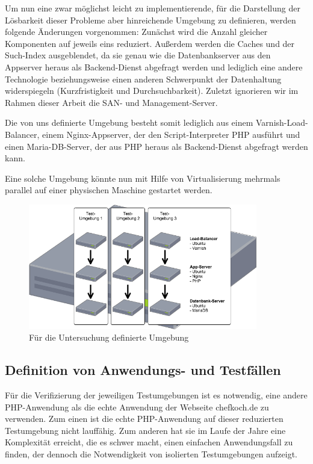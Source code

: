 Um nun eine zwar möglichst leicht zu implementierende, für die Darstellung der Lösbarkeit dieser Probleme aber hinreichende Umgebung zu definieren, werden folgende Änderungen vorgenommen:
Zunächst wird die Anzahl gleicher Komponenten auf jeweils eins reduziert. Außerdem werden die Caches und der Such-Index ausgeblendet, da sie genau wie die Datenbankserver aus den Appserver heraus als Backend-Dienst abgefragt werden und lediglich eine andere Technologie beziehungsweise einen anderen Schwerpunkt der Datenhaltung widerspiegeln (Kurzfristigkeit und Durchsuchbarkeit). Zuletzt ignorieren wir im Rahmen dieser Arbeit die SAN- und Management-Server.

Die von uns definierte Umgebung besteht somit lediglich aus einem Varnish-Load-Balancer, einem Nginx-Appserver, der den Script-Interpreter PHP ausführt und einen Maria-DB-Server, der aus PHP heraus als Backend-Dienst abgefragt werden kann.

Eine solche Umgebung könnte nun mit Hilfe von Virtualisierung mehrmals parallel auf einer physischen Maschine gestartet werden.

\begin{figure}[!ht]
  \begin{center}
    \includegraphics[width=10cm]{bilder/Untersuchungs-Umgebung.png}
    \caption{Für die Untersuchung definierte Umgebung}
  \end{center}
\end{figure}

\subsection{Definition von Anwendungs- und Testfällen}

Für die Verifizierung der jeweiligen Testumgebungen ist es notwendig, eine andere PHP-Anwendung als die echte Anwendung der Webseite chefkoch.de zu verwenden. Zum einen ist die echte PHP-Anwendung auf dieser reduzierten Testumgebung nicht lauffähig. Zum anderen hat sie im Laufe der Jahre eine Komplexität erreicht, die es schwer macht, einen einfachen Anwendungsfall zu finden, der dennoch die Notwendigkeit von isolierten Testumgebungen aufzeigt.


